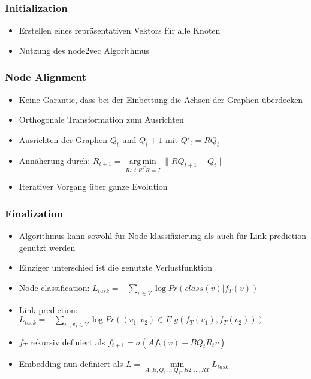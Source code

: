 \documentclass{beamer}
\DeclareMathOperator*{\argmin}{arg\,min}
\begin{document}
\begin{frame}
  \frametitle{Initialization}
  \begin{itemize}
    \item Erstellen eines repräsentativen Vektors für alle Knoten
    \item Nutzung des node2vec Algorithmus
  \end{itemize}
\end{frame}
\begin{frame}
  \frametitle{Node Alignment}
  \begin{itemize}
    \item Keine Garantie, dass bei der Einbettung die Achsen der Graphen überdecken
    \item Orthogonale Transformation zum Ausrichten
    \item Ausrichten der Graphen \(Q_t\) und \(Q_t+1\) mit \(Q'_t = RQ_t\)
    \item Annäherung durch: \(R_{t+1} = \argmin\limits_{R s.t. R^TR =I} \|RQ_{t+1} - Q_t\| \)
    \item Iterativer Vorgang über ganze Evolution
  \end{itemize}
\end{frame}

\begin{frame}
  \frametitle{Finalization}
  \begin{itemize}
    \item Algorithmus kann sowohl für Node klassifizierung als auch für Link prediction genutzt werden
    \item Einziger unterschied ist die genutzte Verlustfunktion
    \item Node classification:  \(L_{task} = -\sum\limits_{v\in V} \log {Pr(class(v)|f_T(v))}\)
    \item Link prediction:   \(L_{task} = -\sum\limits_{v_1, v_2 \in V} \log{Pr((v_1,v_2)\in E | g(f_T(v_1), f_T(v_2)))}\)
    \item \(f_T\) rekursiv definiert als \(f_{t+1} = \sigma(Af_t(v) + BQ_tR_tv)\)
    \item Embedding nun definiert als \( L = \min\limits_{A,B,Q_1, \ldots Q_T,R2, \ldots, RT} L_{task}\)
  \end{itemize}
\end{frame}
\end{document}
